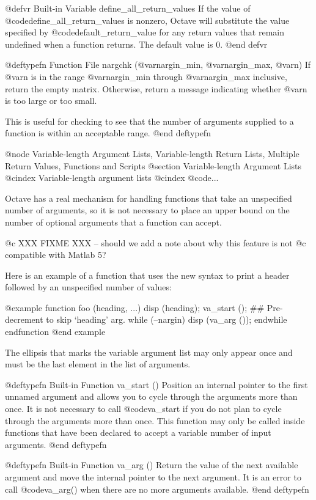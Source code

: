 @defvr {Built-in Variable} define_all_return_values
If the value of @code{define_all_return_values} is nonzero, Octave
will substitute the value specified by @code{default_return_value} for
any return values that remain undefined when a function returns.  The
default value is 0.
@end defvr

@deftypefn {Function File} {} nargchk (@var{nargin_min}, @var{nargin_max}, @var{n})
If @var{n} is in the range @var{nargin_min} through @var{nargin_max}
inclusive, return the empty matrix.  Otherwise, return a message
indicating whether @var{n} is too large or too small.

This is useful for checking to see that the number of arguments supplied
to a function is within an acceptable range.
@end deftypefn

@node Variable-length Argument Lists, Variable-length Return Lists, Multiple Return Values, Functions and Scripts
@section Variable-length Argument Lists
@cindex Variable-length argument lists
@cindex @code{...}

Octave has a real mechanism for handling functions that take an
unspecified number of arguments, so it is not necessary to place an
upper bound on the number of optional arguments that a function can
accept.

@c XXX FIXME XXX -- should we add a note about why this feature is not
@c compatible with Matlab 5?

Here is an example of a function that uses the new syntax to print a
header followed by an unspecified number of values:

@example
function foo (heading, ...)
  disp (heading);
  va_start ();
  ## Pre-decrement to skip `heading' arg.
  while (--nargin)
    disp (va_arg ());
  endwhile
endfunction
@end example

The ellipsis that marks the variable argument list may only appear once
and must be the last element in the list of arguments.

@deftypefn {Built-in Function} {} va_start ()
Position an internal pointer to the first unnamed argument and allows
you to cycle through the arguments more than once.  It is not necessary
to call @code{va_start} if you do not plan to cycle through the
arguments more than once.  This function may only be called inside
functions that have been declared to accept a variable number of input
arguments.
@end deftypefn

@deftypefn {Built-in Function} {} va_arg ()
Return the value of the next available argument and move the internal
pointer to the next argument.  It is an error to call @code{va_arg()}
when there are no more arguments available.
@end deftypefn

